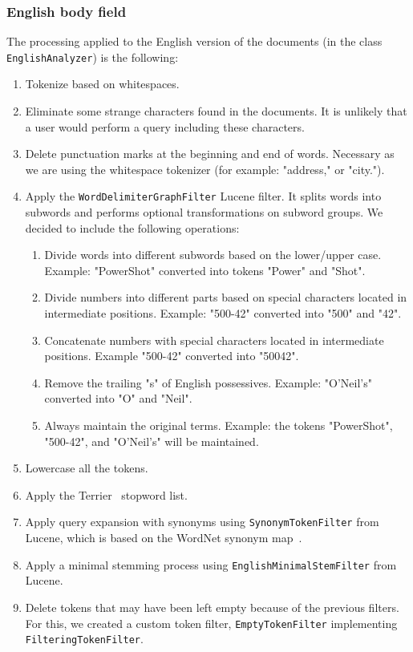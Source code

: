 \subsubsection{English body field}
The processing applied to the English version of the documents (in the class \texttt{EnglishAnalyzer}) is the following:
\begin{enumerate}
    \item Tokenize based on whitespaces.
    \item Eliminate some strange characters found in the documents.
    It is unlikely that a user would perform a query including these characters.
    \item Delete punctuation marks at the beginning and end of words.
    Necessary as we are using the whitespace tokenizer (for example: "address," or "city.").
    \item Apply the \texttt{WordDelimiterGraphFilter} Lucene filter.
    It splits words into subwords and performs optional transformations on subword groups.
    We decided to include the following operations:
    \begin{enumerate}
        \item Divide words into different subwords based on the lower/upper case.
        Example: "PowerShot" converted into tokens "Power" and "Shot".
        \item Divide numbers into different parts based on special characters located in intermediate positions.
        Example: "500-42" converted into "500" and "42".
        \item Concatenate numbers with special characters located in intermediate positions.
        Example "500-42" converted into "50042".
        \item Remove the trailing "s" of English possessives.
        Example: "O'Neil's" converted into "O" and "Neil".
        \item Always maintain the original terms.
        Example: the tokens "PowerShot", "500-42", and "O'Neil's" will be maintained.
    \end{enumerate}
    \item Lowercase all the tokens.
    \item Apply the Terrier~\cite{OunisEtAl2006} stopword list.
    \item Apply query expansion with synonyms using \texttt{SynonymTokenFilter} from Lucene, which is based on the
    WordNet synonym map~\cite{wordnet}.
    \item Apply a minimal stemming process using \texttt{EnglishMinimalStemFilter} from Lucene.
    \item Delete tokens that may have been left empty because of the previous filters.
    For this, we created a custom token filter, \texttt{EmptyTokenFilter} implementing \texttt{FilteringTokenFilter}.
\end{enumerate}

